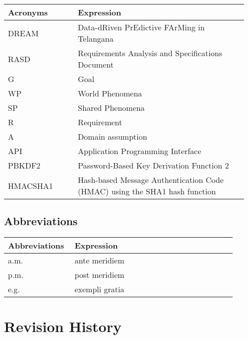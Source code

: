 \begin{center}
	\begin{longtable}{@{}p{0.28\linewidth} p{0.68\linewidth}@{}}
		\toprule
		\textbf{Acronyms}   & \textbf{Expression}\\
		\endfirsthead
		\midrule
		DREAM               & Data-dRiven PrEdictive FArMing in Telangana\\
		RASD                & Requirements Analysis and Specifications Document\\
		G                   & Goal\\
		WP                  & World Phenomena\\
		SP                  & Shared Phenomena\\
		R                   & Requirement\\
		A                   & Domain assumption\\
		API                 & Application Programming Interface\\
		PBKDF2              & Password-Based Key Derivation Function 2 \\ 
		HMACSHA1            & Hash-based Message Authentication Code (HMAC) using the SHA1 hash function \\
		\bottomrule
	\end{longtable}
\end{center}

\subsection{Abbreviations}

\begin{center}
	\begin{longtable}{@{}p{0.28\linewidth} p{0.68\linewidth}@{}}
		\toprule
		\textbf{Abbreviations}  & \textbf{Expression}\\
		\midrule
	    a.m. & ante meridiem\\
	    p.m. & post meridiem\\
	    e.g. & exempli gratia\\
		\bottomrule
	\end{longtable}
\end{center}

\section{Revision History}

